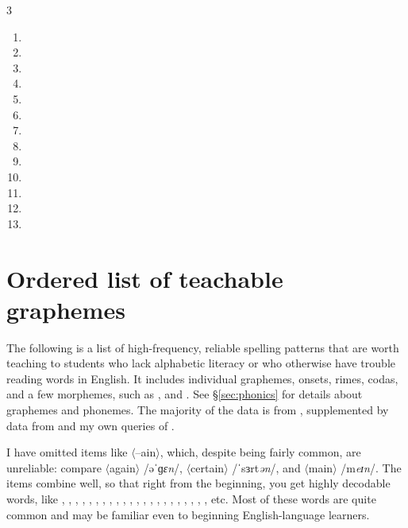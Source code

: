\begin{multicols}{3}
\begin{enumerate}[noitemsep]
\item{}
\item{}
\item{}
\item{}
\item{}
\item{}
\item{}
\item{}
\item{}
\item{}
\item{}
\item{}
\item{}
\end{enumerate}
\end{multicols}
\endgroup

\chapter{Ordered list of teachable graphemes} \label{sec:gpcs-list}

The following is a list of high-frequency, reliable spelling patterns that are worth teaching to students who lack alphabetic literacy or who otherwise have trouble reading words in English. It includes individual graphemes, onsets, rimes, codas, and a few morphemes, such as , and . See \S\ref{sec:phonics} for details about graphemes and phonemes. The majority of the data is from \citet{Fry2004a}, supplemented by data from \citet{Gontijo2003} and my own queries of  \citep{COCA}.

I have omitted items like $\langle$--ain$\rangle$, which, despite being fairly common, are unreliable: compare $\langle$again$\rangle$ /əˈɡ\emph{ɛn}/, $\langle$certain$\rangle$ /ˈsɜrt\emph{ən}/, and $\langle$main$\rangle$ /m\emph{eɪn}/. The items combine well, so that right from the beginning, you get highly decodable words, like , , , , , , , , , , , , , , , , , , , , , , etc. Most of these words are quite common and may be familiar even to beginning English-language learners.

